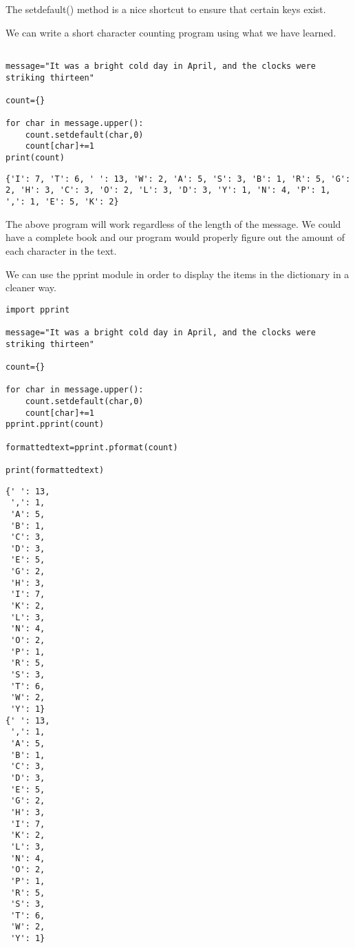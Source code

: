 \documentclass[11pt]{article}
\begin{document}
The setdefault() method is a nice shortcut to ensure that certain keys exist.


We can write a short character counting program using what we have learned.


\begin{verbatim}

message="It was a bright cold day in April, and the clocks were striking thirteen"

count={}

for char in message.upper():
    count.setdefault(char,0)
    count[char]+=1
print(count)

\end{verbatim}

\begin{verbatim}
{'I': 7, 'T': 6, ' ': 13, 'W': 2, 'A': 5, 'S': 3, 'B': 1, 'R': 5, 'G': 2, 'H': 3, 'C': 3, 'O': 2, 'L': 3, 'D': 3, 'Y': 1, 'N': 4, 'P': 1, ',': 1, 'E': 5, 'K': 2}
\end{verbatim}


The above program will work regardless of the length of the message. We could have a complete book and our program would properly figure out the amount of each character in the text.

We can use the pprint module in order to display the items in the dictionary in a cleaner way.

\begin{verbatim}
import pprint

message="It was a bright cold day in April, and the clocks were striking thirteen"

count={}

for char in message.upper():
    count.setdefault(char,0)
    count[char]+=1
pprint.pprint(count)

formattedtext=pprint.pformat(count)

print(formattedtext)

\end{verbatim}

\begin{verbatim}
{' ': 13,
 ',': 1,
 'A': 5,
 'B': 1,
 'C': 3,
 'D': 3,
 'E': 5,
 'G': 2,
 'H': 3,
 'I': 7,
 'K': 2,
 'L': 3,
 'N': 4,
 'O': 2,
 'P': 1,
 'R': 5,
 'S': 3,
 'T': 6,
 'W': 2,
 'Y': 1}
{' ': 13,
 ',': 1,
 'A': 5,
 'B': 1,
 'C': 3,
 'D': 3,
 'E': 5,
 'G': 2,
 'H': 3,
 'I': 7,
 'K': 2,
 'L': 3,
 'N': 4,
 'O': 2,
 'P': 1,
 'R': 5,
 'S': 3,
 'T': 6,
 'W': 2,
 'Y': 1}
\end{verbatim}
\end{document}
